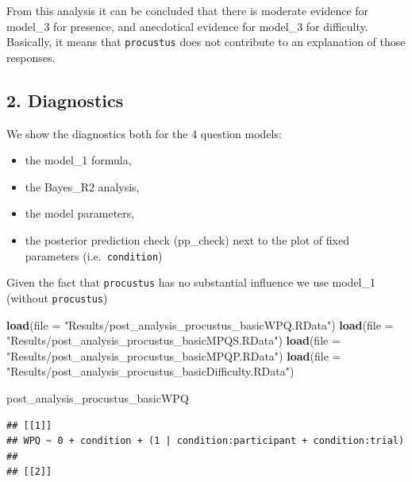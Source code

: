 \documentclass[
]{article}
\newenvironment{Shaded}{\begin{snugshade}}{\end{snugshade}}
\newcommand{\AttributeTok}[1]{\textcolor[rgb]{0.13,0.29,0.53}{#1}}
\newcommand{\FunctionTok}[1]{\textcolor[rgb]{0.13,0.29,0.53}{\textbf{#1}}}
\newcommand{\NormalTok}[1]{#1}
\newcommand{\StringTok}[1]{\textcolor[rgb]{0.31,0.60,0.02}{#1}}
\begin{document}
From this analysis it can be concluded that there is moderate evidence
for model\_3 for presence, and anecdotical evidence for model\_3 for
difficulty. Basically, it means that \texttt{procustus} does not
contribute to an explanation of those responses.

\hypertarget{diagnostics-1}{%
\subsection{2. Diagnostics}\label{diagnostics-1}}

We show the diagnostics both for the 4 question models:

\begin{itemize}
\item
  the model\_1 formula,
\item
  the Bayes\_R2 analysis,
\item
  the model parameters,
\item
  the posterior prediction check (pp\_check) next to the plot of fixed
  parameters (i.e.~\texttt{condition})
\end{itemize}

Given the fact that \texttt{procustus} has no substantial influence we
use model\_1 (without \texttt{procustus})

\begin{Shaded}
\begin{Highlighting}[]
\FunctionTok{load}\NormalTok{(}\AttributeTok{file =} \StringTok{"Results/post\_analysis\_procustus\_basicWPQ.RData"}\NormalTok{)}
\FunctionTok{load}\NormalTok{(}\AttributeTok{file =} \StringTok{"Results/post\_analysis\_procustus\_basicMPQS.RData"}\NormalTok{)}
\FunctionTok{load}\NormalTok{(}\AttributeTok{file =} \StringTok{"Results/post\_analysis\_procustus\_basicMPQP.RData"}\NormalTok{)}
\FunctionTok{load}\NormalTok{(}\AttributeTok{file =} \StringTok{"Results/post\_analysis\_procustus\_basicDifficulty.RData"}\NormalTok{)}

\NormalTok{post\_analysis\_procustus\_basicWPQ}
\end{Highlighting}
\end{Shaded}

\begin{verbatim}
## [[1]]
## WPQ ~ 0 + condition + (1 | condition:participant + condition:trial) 
## 
## [[2]]
\end{verbatim}
\end{document}
